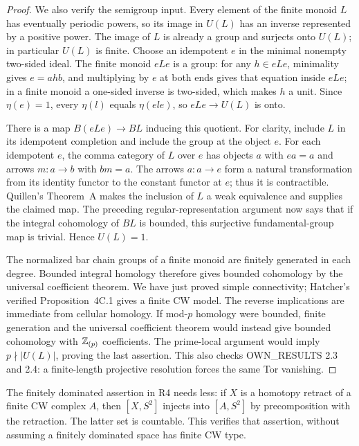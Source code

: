 \begin{proof}
We also verify the semigroup input.  Every element of the finite
monoid $L$ has eventually periodic powers, so its image in $U(L)$
has an inverse represented by a positive power.  The image of $L$
is already a group and surjects onto $U(L)$; in particular $U(L)$
is finite.  Choose an idempotent $e$ in the minimal nonempty
two-sided ideal.  The finite monoid $eLe$ is a group: for any
$h\in eLe$, minimality gives $e=ahb$, and multiplying by $e$ at
both ends gives that equation inside $eLe$; in a finite monoid a
one-sided inverse is two-sided, which makes $h$ a unit.
Since $\eta(e)=1$, every $\eta(l)$ equals $\eta(ele)$, so
$eLe\to U(L)$ is onto.

There is a map $B(eLe)\to BL$ inducing this quotient.
For clarity, include $L$ in its idempotent completion and include
the group at the object $e$.  For each idempotent $e$, the comma
category of $L$ over $e$ has objects $a$ with $ea=a$ and arrows
$m:a\to b$ with $bm=a$.  The arrows $a:a\to e$ form a natural
transformation from its identity functor to the constant functor
at $e$; thus it is contractible.  Quillen's Theorem~A makes the
inclusion of $L$ a weak equivalence and supplies the claimed map.
The preceding regular-representation argument now says that if
the integral cohomology of $BL$ is bounded, this surjective
fundamental-group map is trivial.  Hence $U(L)=1$.

The normalized bar chain groups of a finite monoid are finitely
generated in each degree.  Bounded integral homology therefore
gives bounded cohomology by the universal coefficient theorem.
We have just proved simple connectivity; Hatcher's verified
Proposition~4C.1 gives a finite CW model.  The reverse implications
are immediate from cellular homology.  If mod-$p$ homology were
bounded, finite generation and the universal coefficient theorem
would instead give bounded cohomology with $\mathbb Z_{(p)}$ coefficients.
The prime-local argument would imply $p\nmid|U(L)|$, proving the
last assertion.  This also checks OWN\_RESULTS 2.3 and 2.4: a
finite-length projective resolution forces the same Tor vanishing.
\end{proof}

The finitely dominated assertion in R4 needs less: if $X$ is a
homotopy retract of a finite CW complex $A$, then $[X,S^2]$ injects
into $[A,S^2]$ by precomposition with the retraction.  The latter set
is countable.  This verifies that assertion, without assuming a
finitely dominated space has finite CW type.

